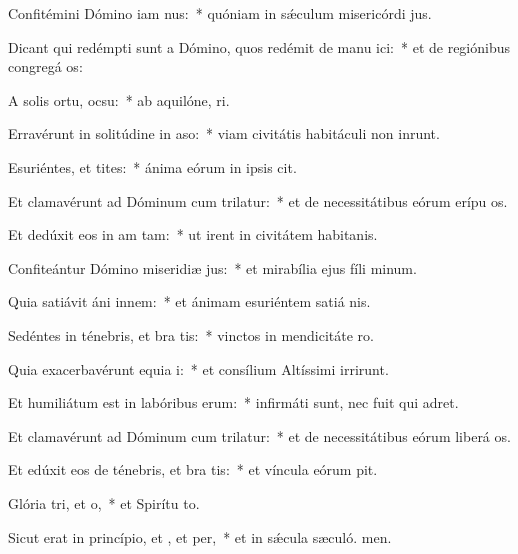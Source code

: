 \item Confitémini Dómino iam nus:~* quóniam in sǽculum misericórdi jus.
\item Dicant qui redémpti sunt a Dómino, quos redémit de manu ici:~* et de regiónibus congregá os:
\item A solis ortu,  ocsu:~* ab aquilóne,  ri.
\item Erravérunt in solitúdine in aso:~* viam civitátis habitáculi non inrunt.
\item Esuriéntes, et tites:~* ánima eórum in ipsis cit.
\item Et clamavérunt ad Dóminum cum trilatur:~* et de necessitátibus eórum erípu os.
\item Et dedúxit eos in am tam:~* ut irent in civitátem habitanis.
\item Confiteántur Dómino miseridiæ jus:~* et mirabília ejus fíli minum.
\item Quia satiávit áni innem:~* et ánimam esuriéntem satiá nis.
\item Sedéntes in ténebris, et bra tis:~* vinctos in mendicitáte  ro.
\item Quia exacerbavérunt equia i:~* et consílium Altíssimi irrirunt.
\item Et humiliátum est in labóribus  erum:~* infirmáti sunt, nec fuit qui adret.
\item Et clamavérunt ad Dóminum cum trilatur:~* et de necessitátibus eórum liberá os.
\item Et edúxit eos de ténebris, et bra tis:~* et víncula eórum pit.
\item Glória tri, et o,~* et Spirítu to.
\item Sicut erat in princípio, et , et per,~* et in sǽcula sæculó. men.
